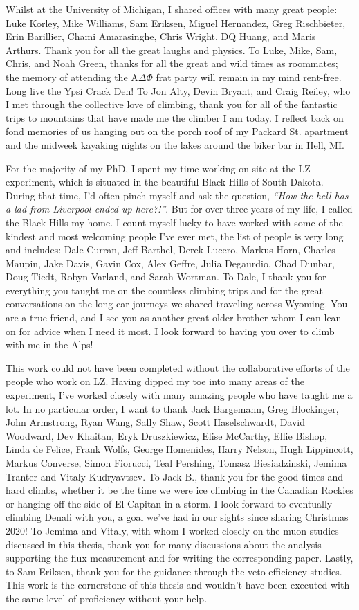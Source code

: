 \documentclass[a4paper,11pt,usegeometry]{scrreprt} %
\begin{document}
Whilst at the University of Michigan, I shared offices with many great people: Luke Korley, Mike Williams, Sam Eriksen, Miguel Hernandez, Greg Rischbieter, Erin Barillier, Chami Amarasinghe, Chris Wright, DQ Huang, and Maris Arthurs. Thank you for all the great laughs and physics. To Luke, Mike, Sam, Chris, and Noah Green, thanks for all the great and wild times as roommates; the memory of attending the A$\Delta\Phi$ frat party will remain in my mind rent-free. Long live the Ypsi Crack Den! To Jon Alty, Devin Bryant, and Craig Reiley, who I met through the collective love of climbing, thank you for all of the fantastic trips to mountains that have made me the climber I am today. I reflect back on fond memories of us hanging out on the porch roof of my Packard St. apartment and the midweek kayaking nights on the lakes around the biker bar in Hell, MI. 

For the majority of my PhD, I spent my time working on-site at the LZ experiment, which is situated in the beautiful Black Hills of South Dakota. During that time, I'd often pinch myself and ask the question, \textit{``How the hell has a lad from Liverpool ended up here?!''}. But for over three years of my life, I called the Black Hills my home. I count myself lucky to have worked with some of the kindest and most welcoming people I've ever met, the list of people is very long and includes: Dale Curran, Jeff Barthel, Derek Lucero, Markus Horn, Charles Maupin, Jake Davis, Gavin Cox, Alex Geffre, Julia Degaurdio, Chad Dunbar, Doug Tiedt, Robyn Varland, and Sarah Wortman. To Dale, I thank you for everything you taught me on the countless climbing trips and for the great conversations on the long car journeys we shared traveling across Wyoming. You are a true friend, and I see you as another great older brother whom I can lean on for advice when I need it most. I look forward to having you over to climb with me in the Alps!

This work could not have been completed without the collaborative efforts of the people who work on LZ. Having dipped my toe into many areas of the experiment, I've worked closely with many amazing people who have taught me a lot. In no particular order, I want to thank Jack Bargemann, Greg Blockinger, John Armstrong, Ryan Wang, Sally Shaw, Scott Haselschwardt, David Woodward, Dev Khaitan, Eryk Druszkiewicz, Elise McCarthy, Ellie Bishop, Linda de Felice, Frank Wolfs, George Homenides, Harry Nelson, Hugh Lippincott, Markus Converse, Simon Fiorucci, Teal Pershing, Tomasz Biesiadzinski, Jemima Tranter and Vitaly Kudryavtsev. To Jack B., thank you for the good times and hard climbs, whether it be the time we were ice climbing in the Canadian Rockies or hanging off the side of El Capitan in a storm. I look forward to eventually climbing Denali with you, a goal we've had in our sights since sharing Christmas 2020! To Jemima and Vitaly, with whom I worked closely on the muon studies discussed in this thesis, thank you for many discussions about the analysis supporting the flux measurement and for writing the corresponding paper. Lastly, to Sam Eriksen, thank you for the guidance through the veto efficiency studies. This work is the cornerstone of this thesis and wouldn't have been executed with the same level of proficiency without your help.
\end{document}
